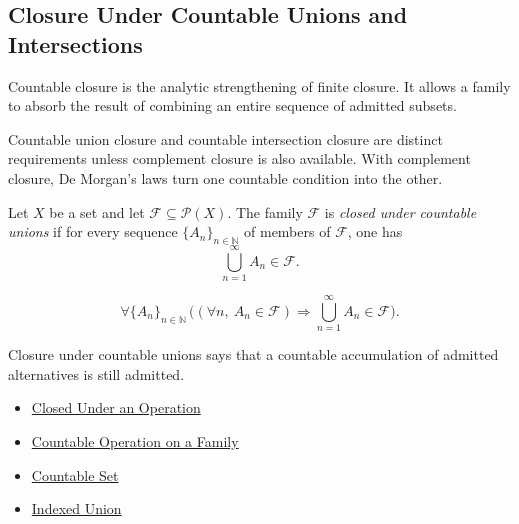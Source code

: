 \subsection{Closure Under Countable Unions and Intersections}

\begin{remark*}[Exposition]
Countable closure is the analytic strengthening of finite closure.  It allows
a family to absorb the result of combining an entire sequence of admitted
subsets.
\end{remark*}

\begin{remark*}[Exposition]
Countable union closure and countable intersection closure are distinct
requirements unless complement closure is also available.  With complement
closure, De Morgan's laws turn one countable condition into the other.
\end{remark*}

\begin{definition}\label{def:closed-under-countable-unions}
Let \(X\) be a set and let \(\mathcal{F}\subseteq\mathcal{P}(X)\).  The family
\(\mathcal{F}\) is \emph{closed under countable unions} if for every sequence
\(\{A_n\}_{n\in\mathbb{N}}\) of members of \(\mathcal{F}\), one has
\[
  \bigcup_{n=1}^{\infty} A_n \in \mathcal{F}.
\]
\end{definition}

\begin{remark*}
\[
  \forall \{A_n\}_{n\in\mathbb{N}}\,
  \bigl((\forall n,\ A_n\in\mathcal{F})
  \Rightarrow
  \bigcup_{n=1}^{\infty}A_n\in\mathcal{F}\bigr).
\]
\end{remark*}

\begin{remark*}[Interpretation]
Closure under countable unions says that a countable accumulation of admitted
alternatives is still admitted.
\end{remark*}

\begin{dependencies}
\begin{itemize}
  \item \hyperref[def:closed-under-operation]{Closed Under an Operation}
  \item \hyperref[def:countable-operation-on-family]{Countable Operation on a Family}
  \item \hyperref[def:countable]{Countable Set}
  \item \hyperref[def:indexed-union]{Indexed Union}
\end{itemize}
\end{dependencies}

